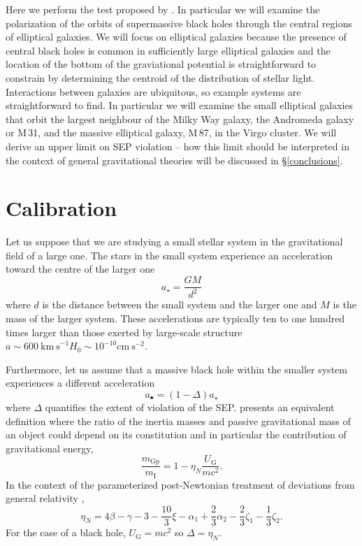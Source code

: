 \documentclass[useAMS,usenatbib]{mn2e}
\begin{document}
Here we perform the test proposed by \cite{2012PhRvL.109e1304H}.
In particular we will examine the polarization of the orbits of
supermassive black holes through the central regions of elliptical
galaxies.  We will focus on elliptical galaxies because the presence
of central black holes is common in sufficiently large elliptical
galaxies and the location of the bottom of the graviational potential
is straightforward to constrain by determining the centroid of the
distribution of stellar light.  Interactions between galaxies are
ubiquitous, so example systems are straightforward to find.  In
particular we will examine the small elliptical galaxies that orbit
the largest neighbour of the Milky Way galaxy, the Andromeda galaxy or
M\,31, and the massive elliptical galaxy, M\,87, in the Virgo cluster.
We will derive an upper limit on SEP violation -- how this limit
should be interpreted in the context of general gravitational theories
will be discussed in \S \ref{conclusions}.

\section{Calibration}

Let us suppose that we are studying a small stellar system in the
gravitational field of a large one.  The stars in the small system
experience an acceleration toward the centre of the larger one
\begin{equation}
  a_\star = \frac{GM}{d^2}
  \label{eq:1}
\end{equation}
where $d$ is the distance between the small system and the larger one
and $M$ is the mass of the larger system.  These accelerations are
typically ten to one hundred times larger than those exerted by
large-scale structure $a \sim 600~\mathrm{km~s}^{-1} H_0 \sim 10^{-10}
\mathrm{cm~s}^{-2}$.

Furthermore, let us assume that a massive black hole within the
smaller system experiences a different acceleration
\begin{equation}
  a_\bullet = \left ( 1 - \Delta \right ) a_\star
  \label{eq:2}
\end{equation}
where $\Delta$ quantifies the extent of violation of the
SEP. \citet{1982RPPh...45..631N} presents an equivalent definition
where the ratio of the inertia masses and passive gravitational mass
of an object could depend on its constitution and in particular the
contribution of gravitational energy,
\begin{equation}
  \frac{m_\mathrm{Gp}}{m_\mathrm{I}} = 1- \eta_N \frac{U_\mathrm{G}}{mc^2}.
  \label{eq:14}
\end{equation}
In the context of the parameterized post-Newtonian treatment of
deviations from general relativity \citep{Will:lrr},
\begin{equation}
  \eta_{N} =4\beta−\gamma − 3− \frac{10}{3} \xi - \alpha_1 +
  \frac{2}{3} \alpha_2 - \frac{2}{3} \zeta_1 - \frac{1}{3} \zeta_2.
\end{equation}
For the case of a black hole, $U_\mathrm{G} = mc^2$ so
$\Delta=\eta_N$. 
\end{document}
